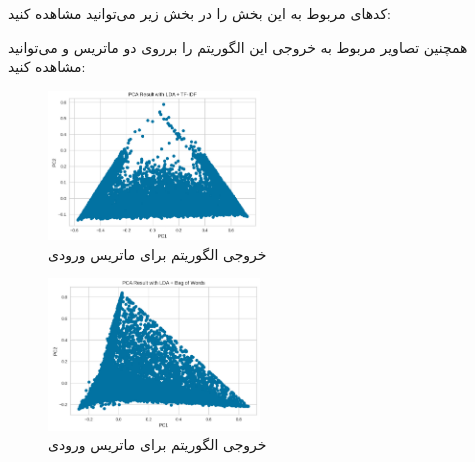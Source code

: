 \documentclass{article}
\begin{document}
کدهای مربوط به این بخش را در بخش زیر می‌توانید مشاهده کنید:
\lr{}

\newpage
همچنین تصاویر مربوط به خروجی این الگوریتم را برروی دو ماتریس  و  می‌توانید مشاهده کنید:
\begin{figure}[ht]
        \centering
        \includegraphics[width=0.5\textwidth]{step5-pca-tf-idf.png}
        \caption{خروجی الگوریتم  برای ماتریس ورودی }
        \label{fig:fig5}
\end{figure}

\begin{figure}[ht]
        \centering
        \includegraphics[width=0.5\textwidth]{step5-pca-bow.png}
        \caption{خروجی الگوریتم  برای ماتریس ورودی }
        \label{fig:fig6}
\end{figure}

\newpage
\end{document}
